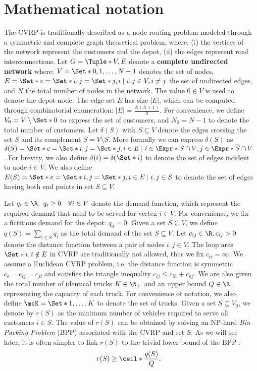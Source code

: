 \section{Mathematical notation}
\label{sec:cvrp-mathematical-notation}

The CVRP is traditionally described as a node routing problem
modeled through a symmetric and complete graph theoretical problem,
where: (i) the vertices of the network represent the customers and the depot,
(ii) the edges represent road interconnections.
Let $G = \Tuple*{V, E}$ denote a \textbf{complete undirected network} where:
$V = \Set*{0, 1, \dots, N - 1}$ denotes the set of nodes,
$E = \Set*{e = \Set*{i, j} = \Set*{j, i} \mid \allowbreak i,j \in V, \allowbreak i \ne j}$ the set of undirected edges,
and $N$ the total number of nodes in the network.
The value $0 \in V$ is used to denote the depot node.
The edge set $E$ has size $|E|$, which can be computed through combinatorial enumeration: $|E| = \frac{N (N+1)}{2}$.
For convenience, we define $V_0 = V \setminus \Set*{0}$ to express the set of customers,
and $N_0 = N - 1$ to denote the total number of customers.
Let $\delta(S)$ with $S \subseteq V$ denote
the edges crossing the set $S$ and its complement $\overline{S} = V \setminus S$.
More formally we can express $\delta(S)$ as
$\delta(S) = \Set*{ e = \Set*{i, j} = \Set*{j, i} \in E \mid i \in \Expr*{S \cap V}, j \in \Expr*{ \overline{S} \cap V } }$.
For brevity, we also define $\delta(i) = \delta(\Set*{i})$
to denote the set of edges incident to node $i \in V$.
We also define $E(S) = \Set*{e = \Set*{i, j} = \Set*{j, i}\in E \mid i, j \in S}$
to denote the set of edges having both end points in set $S \subseteq V$.

Let $q_{i} \in \R,\ q_{i} \ge 0 \quad \forall i \in V$ denote the demand function,
which represent the required demand that need to be served for vertex $i \in V$.
For convenience, we fix a fictitious demand for the depot: $q_0 = 0$.
Given a set $S \subseteq V$, we define $q(S) = \sum_{i \in S} q_i$ as the total demand of the set $S \subseteq V$.
Let $c_{ij} \in \R, c_{ij} > 0$ denote the distance function between a pair of nodes  $i, j \in V$.
The loop arcs $\Set*{i, i} \notin E$ in CVRP are traditionally not allowed, thus we fix $c_{ii} = \infty$.
We assume a Euclidean CVRP problem, i.e. the distance function is symmetric $c_e = c_{ij} = c_{ji}$
and satisfies the triangle inequality $c_{ij} \le c_{ih} + c_{hj}$.
We are also given the total number of identical trucks $K \in \N_+$
and an upper bound $Q \in \R_+$ representing the capacity of each truck.
For convenience of notation, we also define $\mcK = \Set*{1, \dots, K}$ to denote the set of trucks.
Given a set $S \subseteq V_0$,
we denote by $r(S)$ as the minimum number of vehicles required to serve all customers $i \in S$.
The value of $r(S)$ can be obtained by solving
an NP-hard \textit{Bin Packing Problem} (BPP) associated with the CVRP and set $S$.
As we will see later,
it is often simpler to link $r(S)$ to the trivial lower bound of the BPP \parencite{martello1990, martello1990knapsack}:
\begin{equation}
	r(S) \ge \ceil*{\frac{q(S)}{Q}}.
\end{equation}

